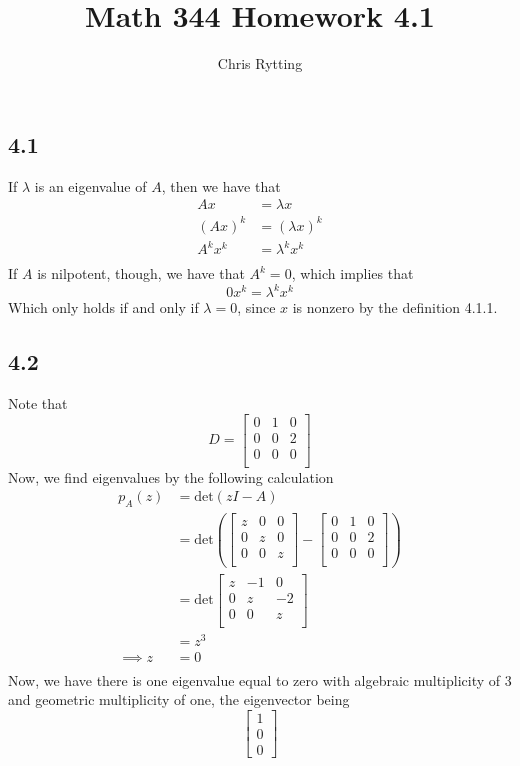 \documentclass[letterpaper,12pt]{article}
\theoremstyle{definition}
\begin{document}
\title{Math 344 Homework 4.1}
\author{Chris Rytting}
\maketitle

\subsection*{4.1}
If $\lambda$ is an eigenvalue of $A$, then we have that 
\begin{align*}
    Ax &= \lambda x \\
    (Ax)^k &= (\lambda x)^k \\
    A^kx^k &= \lambda^k x^k \\
\end{align*}
If $A$ is nilpotent, though, we have that $A^k = 0$, which implies that
\[0x^k = \lambda^k x^k\]
Which only holds if and only if $\lambda = 0 $, since $x$ is nonzero by the definition 4.1.1.

\subsection*{4.2}
Note that 
\[ D = 
\begin{bmatrix}
    0 & 1 & 0 \\
    0 & 0 & 2 \\
    0 & 0 & 0 \\
\end{bmatrix}
\]
Now, we find eigenvalues by the following calculation
\begin{align*}
    p_A(z) &= \text{det} (z I - A) \\
&= \text{det} \left(  
\begin{bmatrix}
    z & 0 & 0 \\
    0 & z & 0 \\
    0 & 0 & z \\
\end{bmatrix}
-
\begin{bmatrix}
    0 & 1 & 0 \\
    0 & 0 & 2 \\
    0 & 0 & 0 \\
\end{bmatrix}\right)\\
&= \text{det}
\begin{bmatrix}
    z & -1 & 0 \\
    0 & z & -2 \\
    0 & 0 & z \\
\end{bmatrix}\\
&= z^3\\
\implies z &= 0\\
\end{align*}
Now, we have there is one eigenvalue equal to zero with algebraic multiplicity of 3 and geometric multiplicity of one, the eigenvector being 
\[
\begin{bmatrix}
    1\\0\\0
\end{bmatrix}
\]
\end{document}
